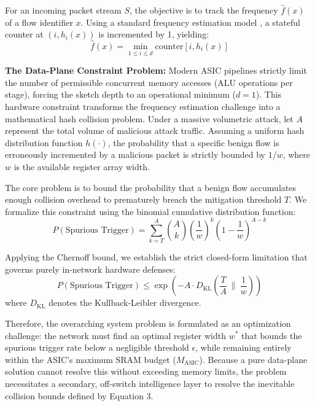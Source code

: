 \documentclass[sigconf, nonacm]{acmart}
\begin{document}
For an incoming packet stream $S$, the objective is to track the frequency $\hat{f}(x)$ of a flow identifier $x$. Using a standard frequency estimation model \cite{cormode2005}, a stateful counter at $(i, h_i(x))$ is incremented by 1, yielding:
\begin{equation}
\hat{f}(x) = \min_{1 \le i \le d} \text{counter}[i, h_i(x)]
\end{equation}

\textbf{The Data-Plane Constraint Problem:} Modern ASIC pipelines strictly limit the number of permissible concurrent memory accesses (ALU operations per stage), forcing the sketch depth to an operational minimum ($d=1$). This hardware constraint transforms the frequency estimation challenge into a mathematical hash collision problem. Under a massive volumetric attack, let $A$ represent the total volume of malicious attack traffic. Assuming a uniform hash distribution function $h(\cdot)$, the probability that a specific benign flow is erroneously incremented by a malicious packet is strictly bounded by $1/w$, where $w$ is the available register array width.

The core problem is to bound the probability that a benign flow accumulates enough collision overhead to prematurely breach the mitigation threshold $T$. We formalize this constraint using the binomial cumulative distribution function:
\begin{equation}
P(\text{Spurious Trigger}) = \sum_{k=T}^{A} \binom{A}{k} \left(\frac{1}{w}\right)^k \left(1 - \frac{1}{w}\right)^{A - k}
\end{equation}

Applying the Chernoff bound, we establish the strict closed-form limitation that governs purely in-network hardware defenses:
\begin{equation}
P(\text{Spurious Trigger}) \le \exp\left( -A \cdot D_{\text{KL}}\left(\frac{T}{A} \ \parallel \ \frac{1}{w}\right) \right)
\end{equation}
\noindent where $D_{\text{KL}}$ denotes the Kullback-Leibler divergence. 

Therefore, the overarching system problem is formulated as an optimization challenge: the network must find an optimal register width $w^*$ that bounds the spurious trigger rate below a negligible threshold $\epsilon$, while remaining entirely within the ASIC's maximum SRAM budget ($M_{\text{ASIC}}$). Because a pure data-plane solution cannot resolve this without exceeding memory limits, the problem necessitates a secondary, off-switch intelligence layer to resolve the inevitable collision bounds defined by Equation 3.
\end{document}
